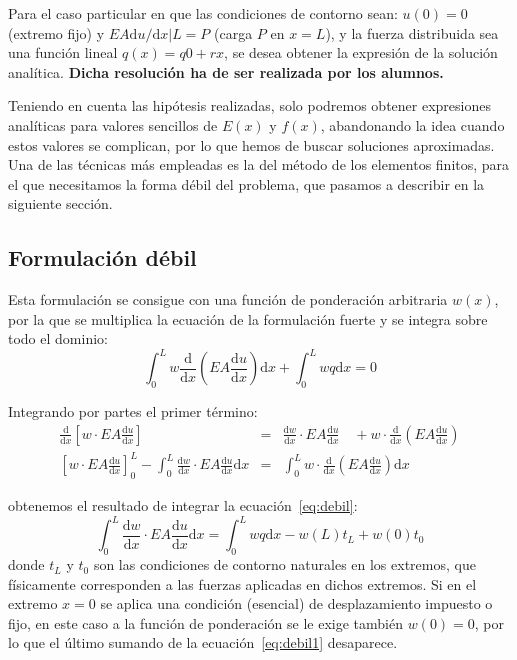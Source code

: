 Para el caso particular en que las condiciones de contorno sean: $u(0) = 0$ (extremo fijo) y $EA\mathrm{d}u/\mathrm{d}x|L = P$ (carga $P$ en $x = L$), y la fuerza distribuida sea una función lineal $q(x) = q0+rx$, se desea obtener la expresión de la solución analítica. \textbf{Dicha resolución ha de ser realizada por los alumnos.}

Teniendo en cuenta las hipótesis realizadas, solo podremos obtener expresiones analíticas para valores sencillos de $E(x)$ y $f(x)$, abandonando la idea cuando estos valores se complican, por lo que hemos de buscar soluciones aproximadas. Una de las técnicas más empleadas es la del método de los elementos finitos, para el que necesitamos la forma débil del problema, que pasamos a describir en la siguiente sección.

\subsection{Formulación débil}
\label{sec:debil}

Esta formulación se consigue con una función de ponderación arbitraria $w(x)$, por la que se multiplica la ecuación de la formulación fuerte y se integra sobre todo el dominio:
\begin{equation}\label{eq:debil}
\int_{0}^{L} w \frac{\mathrm{d}}{\mathrm{d} x}\left(EA \frac{\mathrm{d} u}{\mathrm{d} x}\right) \mathrm{d} x+\int_{0}^{L} w q \mathrm{d} x=0
\end{equation}

Integrando por partes el primer término:
\begin{eqnarray}\label{eq:partes}
\frac{\mathrm{d}}{\mathrm{d} x}\left[w \cdot EA \frac{\mathrm{d} u}{\mathrm{d} x}\right] &=&\frac{\mathrm{d} w}{\mathrm{d} x} \cdot EA \frac{\mathrm{d} u}{\mathrm{d} x} \quad+w \cdot \frac{\mathrm{d}}{\mathrm{d} x}\left(EA \frac{\mathrm{d} u}{\mathrm{d} x}\right) \nonumber\\
\left[w \cdot EA \frac{\mathrm{d} u}{\mathrm{d} x}\right]_{0}^{L}-\int_{0}^{L} \frac{\mathrm{d} w}{\mathrm{d} x} \cdot EA \frac{\mathrm{d} u}{\mathrm{d} x} \mathrm{d} x &=&\int_{0}^{L} w \cdot \frac{\mathrm{d}}{\mathrm{d} x}\left(EA \frac{\mathrm{d} u}{\mathrm{d} x}\right) \mathrm{d} x
\end{eqnarray}

obtenemos el resultado de integrar la ecuación~\ref{eq:debil}:
\begin{equation}\label{eq:debil1}
\int_{0}^{L} \frac{\mathrm{d} w}{\mathrm{d} x} \cdot EA \frac{\mathrm{d} u}{\mathrm{d} x} \mathrm{d} x=\int_{0}^{L} w q \mathrm{d} x-w(L) t_{L}+w(0) t_{0}
\end{equation}
donde $t_{L}$ y $t_{0}$ son las condiciones de contorno naturales en los extremos, que físicamente corresponden a las fuerzas aplicadas en dichos extremos. Si en el extremo $x = 0$ se aplica una condición (esencial) de desplazamiento impuesto o fijo, en este caso a la función de ponderación se le exige también $w(0) = 0$, por lo que el último sumando de la ecuación~\eqref{eq:debil1} desaparece.


